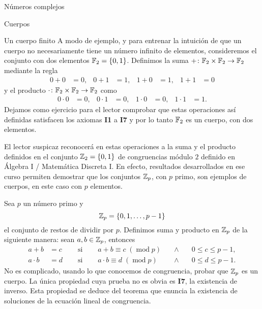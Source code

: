 \begin{chapter}{N\'umeros complejos}
\begin{section}{Cuerpos}
    \begin{subsection}{Un cuerpo finito}
        A modo de ejemplo, y para entrenar la intuición de que un cuerpo no necesariamente tiene un número infinito de elementos, consideremos el conjunto con dos elementos $\mathbb F_2=\{0,1\}$. Definimos la suma $+\colon\mathbb F_2\times \mathbb F_2\to \mathbb F_2$ mediante la regla
        \begin{align*}
            0+0 & =0, & 0+1 & =1, & 1+0 & =1, & 1+1 & =0
        \end{align*}
        y el producto $\cdot \colon\mathbb F_2\times \mathbb F_2\to \mathbb F_2$ como
        \begin{align*}
            0\cdot 0 & =0, & 0\cdot 1 & =0, & 1\cdot 0 & =0, & 1\cdot 1 & =1.
        \end{align*}
        Dejamos como ejercicio para el lector comprobar que estas operaciones así definidas satisfacen los axiomas \textbf{I1} a \textbf{I7} y por lo tanto $\mathbb F_2$ es un cuerpo, con dos elementos.

        \begin{observacion*}
            El lector suspicaz reconocerá en estas operaciones a la suma y el producto definidos en el conjunto $\mathbb Z_2=\{0,1\}$ de congruencias módulo $2$  definido en Álgebra I / Matemática Discreta I. En efecto, resultados desarrollados en ese curso permiten demostrar que los conjuntos $\mathbb Z_p$, con $p$ primo, son ejemplos de cuerpos, en este caso con $p$ elementos.
        \end{observacion*}

        \begin{ejemplo*}
            Sea $p$ un número primo y
            $$
                \mathbb Z_p = \{0,1,\ldots, p-1\}
            $$
            el conjunto de restos de dividir por $p$. Definimos suma y producto en $\mathbb Z_p$ de la siguiente manera: sean $a,b \in \mathbb Z_p$,  entonces
            \begin{equation*}
                \begin{array}{llllll}
                    a+b       & = c\quad & \text{ si }\quad & a+b \equiv c \; (\operatorname{mod}p) \quad & \wedge\quad & 0 \le c \le p-1, \\
                    a \cdot b & = d\quad & \text{ si }\quad & a\cdot b \equiv d \; (\operatorname{mod}p)  & \wedge      & 0 \le d \le p-1.
                \end{array}
            \end{equation*}
            No es complicado, usando lo que conocemos de congruencia, probar que $\mathbb Z_p$  es un cuerpo. La única propiedad cuya prueba no es obvia es  \textbf{I7}, la existencia de inverso. Esta propiedad se deduce del teorema que enuncia la existencia de soluciones  de la ecuación lineal de congruencia.
        \end{ejemplo*}


\end{subsection}
\end{section}
\end{chapter}
